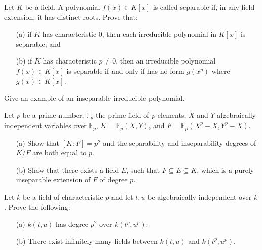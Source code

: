 \begin{prob}[S2003-Q2]
    Let \(K\) be a field. A polynomial \(f(x) \in K[x]\) is called separable if, in any field extension, it has distinct roots. Prove that:
    \begin{itemize}
        \item[(a)] if \(K\) has characteristic 0, then each irreducible polynomial in \(K[x]\) is separable; and
        \item[(b)] if \(K\) has characteristic \(p \neq 0\), then an irreducible polynomial \(f(x) \in K[x]\) is separable if and only if has no form \(g(x^p)\) where \(g(x) \in K[x]\).
    \end{itemize}
    Give an example of an inseparable irreducible polynomial.
\end{prob}



\begin{prob}[S2001-Q4]
    Let \(p\) be a prime number, \(\mathbb{F}_p\) the prime field of \(p\) elements, \(X\) and \(Y\) algebraically independent variables over \(\mathbb{F}_p\), \(K=\mathbb{F}_p(X,Y)\), and \(F=\mathbb{F}_p(X^p-X,Y^p-X)\).
    \begin{itemize}
        \item[(a)] Show that \([K:F]=p^2\) and the separability and inseparability degrees of \(K/F\) are both equal to \(p\).
        \item[(b)] Show that there exists a field \(E\), such that \(F \subseteq E \subseteq K\), which is a purely inseparable extension of \(F\) of degree \(p\).
    \end{itemize}
\end{prob}


\begin{prob}[F2003-Q2]
    Let \(k\) be a field of characteristic \(p\) and let \(t, u\) be algebraically independent over \(k\). Prove the following:
    \begin{itemize}
        \item[(a)] \(k(t, u)\) has degree \(p^2\) over \(k(t^p, u^p)\).
        \item[(b)] There exist infinitely many fields between \(k(t, u)\) and \(k(t^p, u^p)\).
    \end{itemize}
\end{prob}


